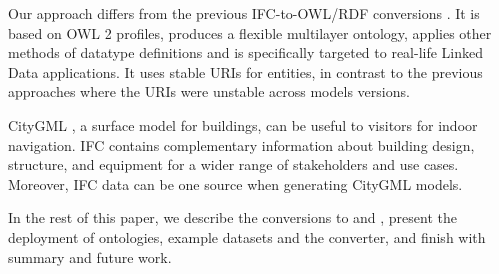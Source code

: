 

Our approach differs from the previous IFC-to-OWL/RDF conversions
\cite{beetz2005ontology,beetz2009ifcowl,pauwels2011interoperability}. It
is based on OWL 2 profiles, produces a flexible multilayer ontology, applies other methods of data\-type definitions and is specifically targeted to
real-life Linked Data applications. It uses stable URIs for entities, in contrast to the previous approaches
where the URIs were unstable across models versions.

CityGML \cite{kolbe2005citygml}, a surface model for buildings, can be useful to visitors for 
indoor navigation. IFC contains complementary information about building design, structure, 
and equipment for a wider range of stakeholders and use cases. Moreover, IFC data can be one source 
when generating CityGML models. %


In the rest of this paper, we describe the conversions to \ifcowl{} and \ifcrdf{}, present the deployment of ontologies, example datasets and the converter, and finish with summary and future work. 
